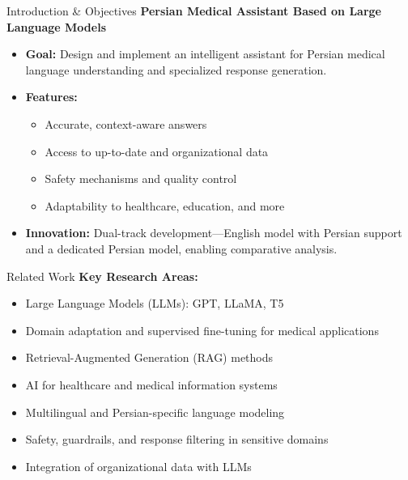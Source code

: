 
\begin{frame}{Introduction \& Objectives}
    \textbf{Persian Medical Assistant Based on Large Language Models}
    \begin{itemize}
        \item \textbf{Goal:} Design and implement an intelligent assistant for Persian medical language understanding and specialized response generation.
        \item \textbf{Features:}
        \begin{itemize}
            \item Accurate, context-aware answers
            \item Access to up-to-date and organizational data
            \item Safety mechanisms and quality control
            \item Adaptability to healthcare, education, and more
        \end{itemize}
        \item \textbf{Innovation:} Dual-track development—English model with Persian support and a dedicated Persian model, enabling comparative analysis.
    \end{itemize}
\end{frame}

\begin{frame}{Related Work}
    \textbf{Key Research Areas:}
    \begin{itemize}
        \item Large Language Models (LLMs): GPT, LLaMA, T5
        \item Domain adaptation and supervised fine-tuning for medical applications
        \item Retrieval-Augmented Generation (RAG) methods
        \item AI for healthcare and medical information systems
        \item Multilingual and Persian-specific language modeling
        \item Safety, guardrails, and response filtering in sensitive domains
        \item Integration of organizational data with LLMs
    \end{itemize}
\end{frame}

